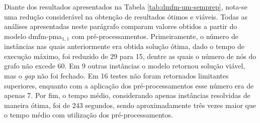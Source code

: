 Diante dos resultados apresentados  na Tabela \ref{tab:dmfm-um-semprep}, nota-se
uma redução  considerável na obtenção de  resultados ótimos e viáveis.  Todas as
análises  apresentadas neste  parágrafo  comparam valores  obtidos  a partir  do
modelo \gls{dmfm-pma}$_{1,  1}$ com pré-processamentos. Primeiramente,  o número
de instâncias nas quais anteriormente era  obtida solução ótima, dado o tempo de
execução máximo, foi reduzido de 29 para 15,  dentre as quais o número de nós do
grafo não  excede 60. Em 9  outras instâncias o modelo  retornou solução viável,
mas o {\em  gap} não foi fechado.  Em 16 testes não  foram retornados limitantes
superiores, enquanto com  a aplicação dos pré-processamentos esse  número era de
apenas 7. Por  fim, o tempo médio, considerando apenas  instâncias resolvidas de
maneira ótima, foi de 243 segundos, sendo aproximadamente três vezes maior que o
tempo médio com utilização dos pré-processamentos.

